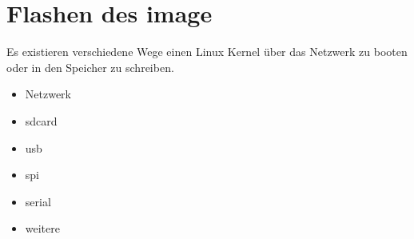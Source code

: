 \section{Flashen des image}%
\label{sec:flashen_des_image}

Es existieren verschiedene Wege einen Linux Kernel über das Netzwerk zu booten
oder in den Speicher zu schreiben.

\begin{itemize}
    \item Netzwerk
    \item sdcard
    \item usb
    \item spi
    \item serial
    \item weitere
\end{itemize}
















